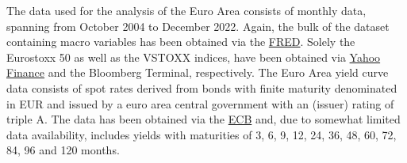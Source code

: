 The data used for the analysis of the Euro Area consists of monthly data, spanning from October 2004 to December 2022. Again, the bulk of the dataset containing macro variables has been obtained via the \href{https://fred.stlouisfed.org/}{FRED}. Solely the Eurostoxx 50 as well as the VSTOXX indices, have been obtained via \href{https://finance.yahoo.com/}{Yahoo Finance} and the Bloomberg Terminal, respectively. The Euro Area yield curve data consists of spot rates derived from bonds with finite maturity denominated in EUR and issued by a euro area central government with an (issuer) rating of triple A. The data has been obtained via the \href{https://www.ecb.europa.eu/stats/financial_markets_and_interest_rates/euro_area_yield_curves/html/index.en.html}{ECB} and, due to somewhat limited data availability, includes yields with maturities of 3, 6, 9, 12, 24, 36, 48, 60, 72, 84, 96 and 120 months. 